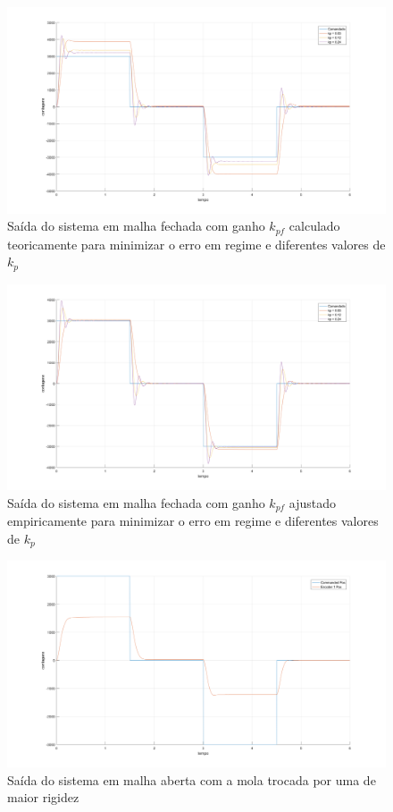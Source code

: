 \begin{figure}
    \centering
    \includegraphics[width=\textwidth]{0_img/malha_fechada.png}
    \caption{Saída do sistema em malha fechada com ganho $k_{pf}$ calculado teoricamente para minimizar o erro em regime e diferentes valores de $k_p$}
    \label{fig:fechada}
\end{figure}
\begin{figure}
    \centering
    \includegraphics[width=\textwidth]{0_img/malha_fechada_corrigida.png}
    \caption{Saída do sistema em malha fechada com ganho $k_{pf}$ ajustado empiricamente para minimizar o erro em regime e diferentes valores de $k_p$}
    \label{fig:fechada_corrigida}
\end{figure}

\begin{figure}
    \centering
    \includegraphics[width=\textwidth]{0_img/malha_aberta_mola.png}
    \caption{Saída do sistema em malha aberta com a mola trocada por uma de maior rigidez}
    \label{fig:aberta_mola}
\end{figure}

